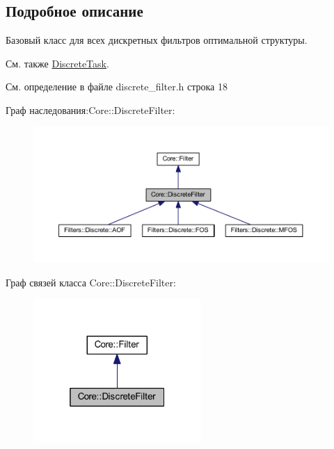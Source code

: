 \subsection{Подробное описание}
Базовый класс для всех дискретных фильтров оптимальной структуры. 

\begin{DoxySeeAlso}{См. также}
\hyperlink{class_core_1_1_discrete_task}{Discrete\+Task}. 
\end{DoxySeeAlso}


См. определение в файле discrete\+\_\+filter.\+h строка 18



Граф наследования\+:Core\+:\+:Discrete\+Filter\+:
\nopagebreak
\begin{figure}[H]
\begin{center}
\leavevmode
\includegraphics[width=350pt]{class_core_1_1_discrete_filter__inherit__graph}
\end{center}
\end{figure}


Граф связей класса Core\+:\+:Discrete\+Filter\+:
\nopagebreak
\begin{figure}[H]
\begin{center}
\leavevmode
\includegraphics[width=181pt]{class_core_1_1_discrete_filter__coll__graph}
\end{center}
\end{figure}


